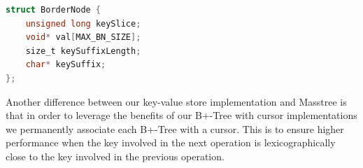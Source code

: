 \begin{lstlisting}[language=C, caption={Border node type definition}, captionpos=b, label={lst:bordernode}]
struct BorderNode {
    unsigned long keySlice;
    void* val[MAX_BN_SIZE];
    size_t keySuffixLength;
    char* keySuffix;
};
\end{lstlisting}

Another difference between our key-value store implementation and Masstree is that in order to leverage the benefits of our B+-Tree with cursor implementations we permanently associate each B+-Tree with a cursor. This is to ensure higher performance when the key involved in the next operation is lexicographically close to the key involved in the previous operation. 
